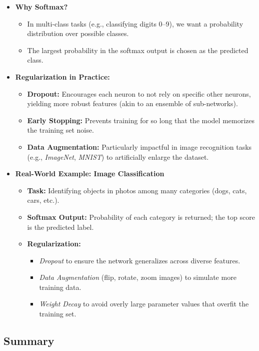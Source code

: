 \documentclass{article}
\begin{document}
\begin{itemize}
    \item \textbf{Why Softmax?} 
    \begin{itemize}
        \item In multi-class tasks (e.g., classifying digits 0--9), we want a probability distribution over possible classes.
        \item The largest probability in the softmax output is chosen as the predicted class.
    \end{itemize}
    \item \textbf{Regularization in Practice:}
    \begin{itemize}
        \item \textbf{Dropout:} Encourages each neuron to not rely on specific other neurons, yielding more robust features (akin to an ensemble of sub-networks).
        \item \textbf{Early Stopping:} Prevents training for so long that the model memorizes the training set noise.
        \item \textbf{Data Augmentation:} Particularly impactful in image recognition tasks (e.g., \textit{ImageNet}, \textit{MNIST}) to artificially enlarge the dataset.
    \end{itemize}
    \item \textbf{Real-World Example: Image Classification}
    \begin{itemize}
        \item \textbf{Task:} Identifying objects in photos among many categories (dogs, cats, cars, etc.).
        \item \textbf{Softmax Output:} Probability of each category is returned; the top score is the predicted label.
        \item \textbf{Regularization:} 
            \begin{itemize}
                \item \textit{Dropout} to ensure the network generalizes across diverse features.
                \item \textit{Data Augmentation} (flip, rotate, zoom images) to simulate more training data.
                \item \textit{Weight Decay} to avoid overly large parameter values that overfit the training set.
            \end{itemize}
    \end{itemize}
\end{itemize}

\subsection{Summary}
\end{document}
